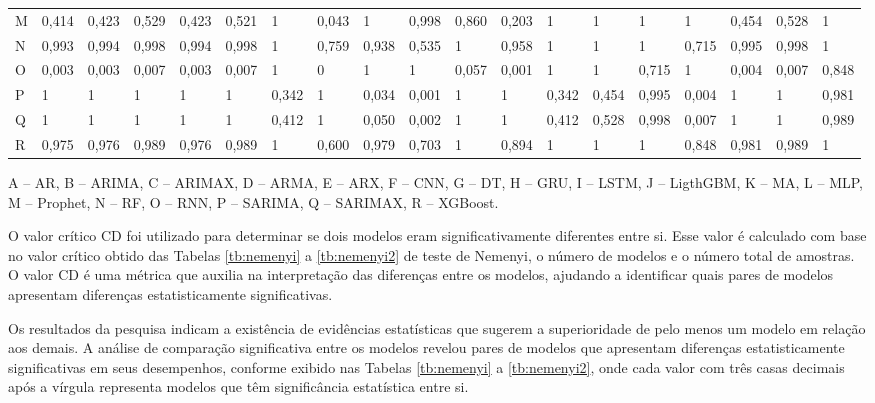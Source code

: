 \begin{landscape}
\begin{table}[!htb]
\begin{tabular}{@{}lllllllllllllllllll@{}}
M      & 0,414 & 0,423 & 0,529 & 0,423 & 0,521 & 1     & 0,043 & 1     & 0,998 & 0,860 & 0,203 & 1     & 1     & 1     & 1     & 0,454 & 0,528 & 1     \\
N      & 0,993 & 0,994 & 0,998 & 0,994 & 0,998 & 1     & 0,759 & 0,938 & 0,535 & 1     & 0,958 & 1     & 1     & 1     & 0,715 & 0,995 & 0,998 & 1     \\
O      & 0,003 & 0,003 & 0,007 & 0,003 & 0,007 & 1     & 0     & 1     & 1     & 0,057 & 0,001 & 1     & 1     & 0,715 & 1     & 0,004 & 0,007 & 0,848 \\
P      & 1     & 1     & 1     & 1     & 1     & 0,342 & 1     & 0,034 & 0,001 & 1     & 1     & 0,342 & 0,454 & 0,995 & 0,004 & 1     & 1     & 0,981 \\
Q      & 1     & 1     & 1     & 1     & 1     & 0,412 & 1     & 0,050 & 0,002 & 1     & 1     & 0,412 & 0,528 & 0,998 & 0,007 & 1     & 1     & 0,989 \\
R      & 0,975 & 0,976 & 0,989 & 0,976 & 0,989 & 1     & 0,600 & 0,979 & 0,703 & 1     & 0,894 & 1     & 1     & 1     & 0,848 & 0,981 & 0,989 & 1     \\ \bottomrule
\end{tabular}
	\vspace{2mm}
	
	\captionsetup{justification=centering} %
	A -- AR,
	B -- ARIMA,
	C -- ARIMAX,
	D -- ARMA,
	E -- ARX,
	F -- CNN,
	G -- DT,
	H -- GRU,
	I -- LSTM,
	J -- LigthGBM,
	K -- MA,
	L -- MLP,
	M -- Prophet,
	N -- RF,
	O -- RNN,
	P -- SARIMA,
	Q -- SARIMAX,
	R -- XGBoost.
	
\end{table}

\end{landscape}

O valor crítico CD foi utilizado para determinar se dois modelos eram significativamente diferentes entre si. Esse valor é calculado com base no valor crítico obtido das Tabelas \ref{tb:nemenyi} a \ref{tb:nemenyi2} de teste de Nemenyi, o número de modelos e o número total de amostras. O valor CD é uma métrica que auxilia na interpretação das diferenças entre os modelos, ajudando a identificar quais pares de modelos apresentam diferenças estatisticamente significativas.

Os resultados da pesquisa indicam a existência de evidências estatísticas que sugerem a superioridade de pelo menos um modelo em relação aos demais. A análise de comparação significativa entre os modelos revelou pares de modelos que apresentam diferenças estatisticamente significativas em seus desempenhos, conforme exibido nas Tabelas \ref{tb:nemenyi} a \ref{tb:nemenyi2}, onde cada valor com três casas decimais após a vírgula representa modelos que têm significância estatística entre si.

